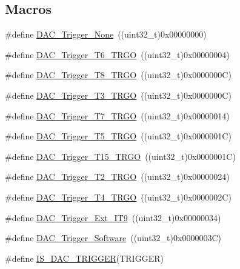 \subsection*{Macros}
\begin{DoxyCompactItemize}
\item 
\#define \hyperlink{group___d_a_c__trigger__selection_ga7849138e043267668d755390d923e4ba}{D\+A\+C\+\_\+\+Trigger\+\_\+\+None}~((uint32\+\_\+t)0x00000000)
\item 
\#define \hyperlink{group___d_a_c__trigger__selection_ga083307783678a2f1d3066db57dc84cfe}{D\+A\+C\+\_\+\+Trigger\+\_\+\+T6\+\_\+\+T\+R\+GO}~((uint32\+\_\+t)0x00000004)
\item 
\#define \hyperlink{group___d_a_c__trigger__selection_ga756700c6621eadb807e21a16966580a0}{D\+A\+C\+\_\+\+Trigger\+\_\+\+T8\+\_\+\+T\+R\+GO}~((uint32\+\_\+t)0x0000000\+C)
\item 
\#define \hyperlink{group___d_a_c__trigger__selection_ga82cbaedc35164c8b9fe0be2faec9b909}{D\+A\+C\+\_\+\+Trigger\+\_\+\+T3\+\_\+\+T\+R\+GO}~((uint32\+\_\+t)0x0000000\+C)
\item 
\#define \hyperlink{group___d_a_c__trigger__selection_ga9b92d497746be54af46ae4e9c1fc4a6f}{D\+A\+C\+\_\+\+Trigger\+\_\+\+T7\+\_\+\+T\+R\+GO}~((uint32\+\_\+t)0x00000014)
\item 
\#define \hyperlink{group___d_a_c__trigger__selection_ga35352cebfd1ae8a3d63e374a5d86a85d}{D\+A\+C\+\_\+\+Trigger\+\_\+\+T5\+\_\+\+T\+R\+GO}~((uint32\+\_\+t)0x0000001\+C)
\item 
\#define \hyperlink{group___d_a_c__trigger__selection_ga9f738c0c1366a588ac4fa9e060278c70}{D\+A\+C\+\_\+\+Trigger\+\_\+\+T15\+\_\+\+T\+R\+GO}~((uint32\+\_\+t)0x0000001\+C)
\item 
\#define \hyperlink{group___d_a_c__trigger__selection_ga3bfbff1e03af1fd17a57a43e57420fe6}{D\+A\+C\+\_\+\+Trigger\+\_\+\+T2\+\_\+\+T\+R\+GO}~((uint32\+\_\+t)0x00000024)
\item 
\#define \hyperlink{group___d_a_c__trigger__selection_ga58ccb2de3d22d66ee975152f5edb330a}{D\+A\+C\+\_\+\+Trigger\+\_\+\+T4\+\_\+\+T\+R\+GO}~((uint32\+\_\+t)0x0000002\+C)
\item 
\#define \hyperlink{group___d_a_c__trigger__selection_ga67c15b2c26246a2304f9db28e25adcc4}{D\+A\+C\+\_\+\+Trigger\+\_\+\+Ext\+\_\+\+I\+T9}~((uint32\+\_\+t)0x00000034)
\item 
\#define \hyperlink{group___d_a_c__trigger__selection_gadef77bb8bbd109232900902402ef637f}{D\+A\+C\+\_\+\+Trigger\+\_\+\+Software}~((uint32\+\_\+t)0x0000003\+C)
\item 
\#define \hyperlink{group___d_a_c__trigger__selection_ga4409b79639e6ae3b1f0ed61a33c810a3}{I\+S\+\_\+\+D\+A\+C\+\_\+\+T\+R\+I\+G\+G\+ER}(T\+R\+I\+G\+G\+ER)
\end{DoxyCompactItemize}


